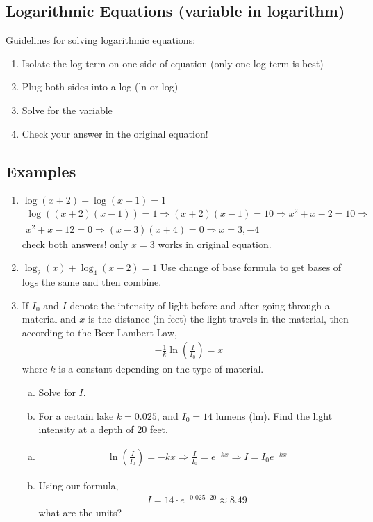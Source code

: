 \documentclass{tufte-handout}
\begin{document}
\subsection{Logarithmic Equations (variable in logarithm)}
Guidelines for solving logarithmic equations:
\begin{enumerate}
\item Isolate the log term on one side of equation (only one log term is best)
\item Plug both sides into a log (ln or log)
\item Solve for the variable
\item Check your answer in the original equation!
\end{enumerate}

\subsection{Examples}
\begin{enumerate}
\item $\log(x + 2) + \log(x-1) = 1$
\begin{align*}
\log((x+2)(x-1)) = 1 \Rightarrow 
(x+2)(x-1) = 10 \Rightarrow
x^2 + x - 2 = 10 \Rightarrow \\
x^2 + x - 12 = 0 \Rightarrow
(x-3)(x+4) = 0 \Rightarrow
x = 3, -4
\end{align*}
check both answers! only $x = 3$ works in original equation.

\item $\log_2(x) + \log_4(x-2) = 1$  Use change of base formula to get bases of logs the same and then combine.

\item If $I_0$ and $I$ denote the intensity of light before and after going through a material and $x$ is the distance (in feet) the light travels in the material, then according to the Beer-Lambert Law, 
\begin{align*}
-\frac{1}{k} \ln\left( \frac{I}{I_0} \right) = x
\end{align*}
where $k$ is a constant depending on the type of material.
\begin{enumerate}[(a)]
\item Solve for $I$.
\item For a certain lake $k = 0.025$, and $I_0 = 14$ lumens (lm). Find the light intensity at a depth of 20 feet.
\end{enumerate}
\begin{enumerate}[(a)]
\item \begin{align*}
\ln\left( \frac{I}{I_0} \right) = -kx \Rightarrow 
\frac{I}{I_0} = e^{-kx} \Rightarrow
I = I_0 e^{-kx}
\end{align*}

\item Using our formula,
\begin{align*}
I = 14 \cdot e^{-0.025\cdot 20} \approx 8.49
\end{align*}
what are the units?
\end{enumerate}
\end{enumerate}
\end{document}

